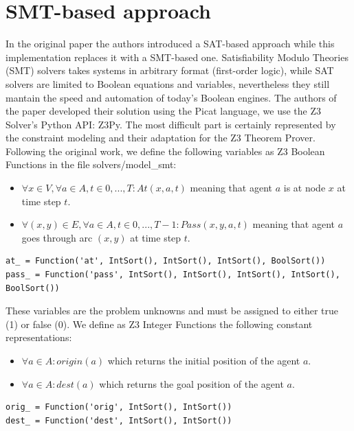 \documentclass[12pt, a4paper, hidelinks]{article}
\numberwithin{equation}{section}
\begin{document}
\section{SMT-based approach}\label{sec:smt-based-approach}
In the original paper the authors introduced a SAT-based approach while this implementation replaces it with a SMT-based one. 
Satisfiability Modulo Theories (SMT) solvers takes systems in arbitrary format (first-order logic), while SAT solvers are limited to Boolean equations and variables, nevertheless they still mantain the speed and automation of today's Boolean engines.
The authors of the paper developed their solution using the Picat language, we use the Z3 Solver's Python API: Z3Py.
The most difficult part is certainly represented by the constraint modeling and their adaptation for the Z3 Theorem Prover.
Following the original work, we define the following variables as Z3 Boolean Functions in the file solvers/model\_smt:

\begin{itemize}
\item $\forall x \in V, \forall a \in A, t \in {0, ..., T} : At(x, a, t)$ meaning that agent $a$ is at node $x$ at time step $t$.
\item $\forall(x, y)\in E, \forall a \in A, t \in {0, ..., T-1} : Pass(x, y, a, t)$ meaning that agent $a$ goes through arc $(x, y)$ at time step $t$. 
\end{itemize}

\begin{lstlisting}[label={lst:atpass}]
at_ = Function('at', IntSort(), IntSort(), IntSort(), BoolSort())
pass_ = Function('pass', IntSort(), IntSort(), IntSort(), IntSort(), BoolSort())
\end{lstlisting}

These variables are the problem unknowns and must be assigned to either true (1) or false (0).
We define as Z3 Integer Functions the following constant representations:

\begin{itemize}
\item $\forall a \in A : origin(a)$ which returns the initial position of the agent $a$.
\item $\forall a \in A : dest(a)$ which returns the goal position of the agent $a$.
\end{itemize}

\begin{lstlisting}[label={lst:origdest}]
orig_ = Function('orig', IntSort(), IntSort())
dest_ = Function('dest', IntSort(), IntSort())
\end{lstlisting}
\end{document}
